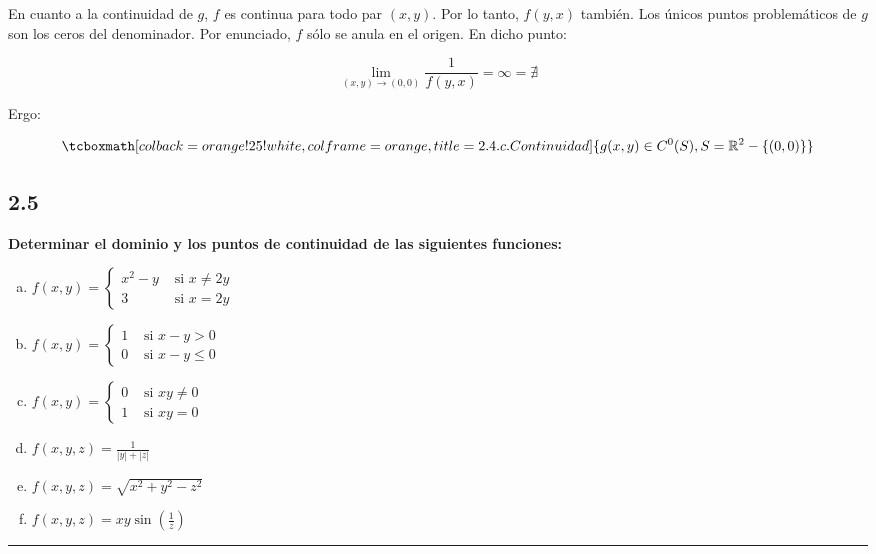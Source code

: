 \documentclass{article}
\renewcommand{\Bbb}{\mathbb}
\begin{document}
En cuanto a la continuidad de $g$, $f$ es continua para todo par $(x,y)$. Por lo tanto, $f(y, x)$ también. Los únicos puntos problemáticos de $g$ son los ceros del denominador. Por enunciado, $f$ sólo se anula en el origen. En dicho punto:

\begin{equation}
\lim_{(x,y) \rightarrow (0,0)} \frac{1}{f(y,x)} = \infty = \nexists
\end{equation}

Ergo:

\begin{equation}
\tcboxmath[colback=orange!25!white,colframe=orange,title=2.4.c. Continuidad ]
{ g(x,y) \in C^0(S), S = \Bbb R^2 - \{ (0,0) \} }
\end{equation}

\subsection*{2.5}
\label{subsec:2.5}

\textbf{Determinar el dominio y los puntos de continuidad de las siguientes funciones:}

\begin{enumerate}[(a)]
\bfseries
\item $ f(x,y) = \left\{ \begin{array}{ll}
x^2 - y &\text{ si } x \neq 2y \\
3 &\text{ si } x = 2y
\end{array} \right. $

\item $f(x,y) = \left\{ \begin{array}{ll}
1 &\text{ si } x - y > 0 \\
0 &\text{ si } x - y \leq 0
\end{array} \right.$

\item $f(x,y) = \left\{ \begin{array}{ll}
0 &\text{ si } xy \neq 0 \\
1 &\text{ si } xy = 0
\end{array} \right.$

\item $f(x, y, z) = \frac{1}{|y| + |z|}$

\item $f(x, y, z) = \sqrt{x^2 + y^2 - z^2}$

\item $f(x, y, z) = x y \sin\left( \frac{1}{z} \right)$

\end{enumerate}
\hrule
\end{document}
